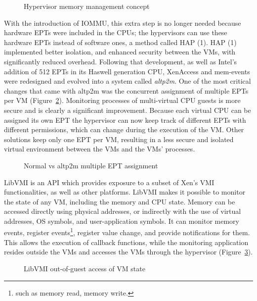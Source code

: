 \begin{figure}
	\centering
	
	\caption{Hypervisor memory management concept}
	\label{fig:hypmm}
\end{figure}

\par With the introduction of \ac{IOMMU}, this extra step is no longer needed because hardware \acp{EPT} were included in the \ac{CPU}s; the hypervisors can use these hardware \acp{EPT} instead of software ones, a method called \ac{HAP (1)}. \ac{HAP (1)} implemented better isolation, and enhanced security between the \acp{VM}, with significantly reduced overhead. Following that development, as well as Intel's addition of 512 \acp{EPT} in its Haswell generation \ac{CPU}, XenAccess and mem-events were redesigned and evolved into a system called \emph{altp2m}. One of the most critical changes that came with altp2m was the concurrent assignment of multiple \ac{EPT}s per \ac{VM} (Figure~\ref{fig:ept}). Monitoring processes of multi-virtual \ac{CPU} guests is more secure and is clearly a significant improvement. Because each virtual \ac{CPU} can be assigned its own \ac{EPT} the hypervisor can now keep track of different \acp{EPT} with different permissions, which can change during the execution of the \ac{VM}. Other solutions keep only one \ac{EPT} per \ac{VM}, resulting in a less secure and isolated virtual environment between the \acp{VM} and the \acp{VM}' processes.

\begin{figure}[ht]
	\centering
	\scalebox{0.95}{}
	\caption{Normal vs altp2m multiple \ac{EPT} assignment}
	\label{fig:ept}
\end{figure}

\par LibVMI is an \ac{API} which provides exposure to a subset of Xen’s \ac{VMI} functionalities, as well as other platforms. LibVMI makes it possible to monitor the state of any \ac{VM}, including the memory and \ac{CPU} state. Memory can be accessed directly using physical addresses, or indirectly with the use of virtual addresses, \ac{OS} symbols, and user-application symbols. It can monitor memory events, register events\footnote{such as memory read, memory write.}, register value change, and provide notifications for them. This allows the execution of callback functions, while the monitoring application resides outside the \acp{VM} and accesses the \acp{VM} through the hypervisor (Figure~\ref{fig:libvmi}). 


\begin{figure}[ht]
	\centering
	
	\caption{LibVMI out-of-guest access of \ac{VM} state}
	\label{fig:libvmi}
\end{figure}


